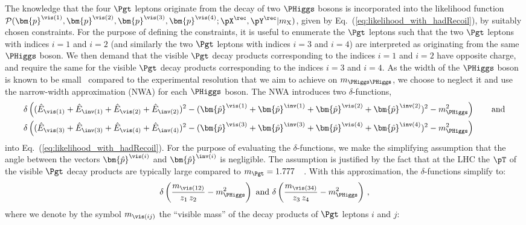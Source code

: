 The knowledge that the four $\Pgt$ leptons originate from the decay of two $\PHiggs$ bosons is incorporated into the likelihood function 
$\mathcal{P}(\bm{p}^{\vis(1)},\bm{p}^{\vis(2)},\bm{p}^{\vis(3)},\bm{p}^{\vis(4)};\pX^{\rec},\pY^{\rec}|m_{\textrm{X}})$,
given by Eq.~(\ref{eq:likelihood_with_hadRecoil}), by suitably chosen constraints.
For the purpose of defining the constraints, it is useful to enumerate the $\Pgt$ leptons 
such that the two $\Pgt$ leptons with indices $i=1$ and $i=2$ (and similarly the two $\Pgt$ leptons with indices $i=3$ and $i=4$) are interpreted as originating from the same $\PHiggs$ boson.
We then demand that the visible $\Pgt$ decay products corresponding to the indices $i=1$ and $i=2$ have opposite charge,
and require the same for the visible $\Pgt$ decay products corresponding to the indices $i=3$ and $i=4$.
As the width of the $\PHiggs$ boson is known to be small~\cite{HIG-14-002,Aad:2015xua} compared to the experimental resolution that we aim to achieve on $m_{\PHiggs\PHiggs}$,
we choose to neglect it and use the narrow-width approximation (NWA) for each $\PHiggs$ boson.
The NWA introduces two $\delta$-functions, 
\begin{align}
 & \delta\left( (\hat{E}_{\vis(1)} + \hat{E}_{\inv(1)} + \hat{E}_{\vis(2)} + \hat{E}_{\inv(2)})^{2} - (\bm{\hat{p}}^{\vis(1)} + \bm{\hat{p}}^{\inv(1)} + \bm{\hat{p}}^{\vis(2)} + \bm{\hat{p}}^{\inv(2)})^{2} - m_{\PHiggs}^{2} \right) \qquad \mbox{and} \nonumber \\
 & \delta\left( (\hat{E}_{\vis(3)} + \hat{E}_{\inv(3)} + \hat{E}_{\vis(4)} + \hat{E}_{\inv(4)})^{2} - (\bm{\hat{p}}^{\vis(3)} + \bm{\hat{p}}^{\inv(3)} + \bm{\hat{p}}^{\vis(4)} + \bm{\hat{p}}^{\inv(4)})^{2} - m_{\PHiggs}^{2} \right)
\end{align}
into Eq.~(\ref{eq:likelihood_with_hadRecoil}).
For the purpose of evaluating the $\delta$-functions,
we make the simplifying assumption that the angle between the vectors $\bm{\hat{p}}^{\vis(i)}$ and $\bm{\hat{p}}^{\inv(i)}$ is negligible.
The assumption is justified by the fact that at the LHC the $\pT$ of the visible $\Pgt$ decay products are typically large compared to $m_{\Pgt} = 1.777$~\GeV~\cite{PDG}.
With this approximation, the $\delta$-functions simplify to:
\begin{equation*}
\delta\left(\frac{m_{\vis(12)}}{z_{1} \, z_{2}} - m_{\PHiggs}^{2}\right) \mbox{ and } \delta\left(\frac{m_{\vis(34)}}{z_{3} \, z_{4}} - m_{\PHiggs}^{2}\right) \, ,
\end{equation*}
where we denote by the symbol $m_{\vis(ij)}$ the ``visible mass'' of the decay products of $\Pgt$ leptons $i$ and $j$:
